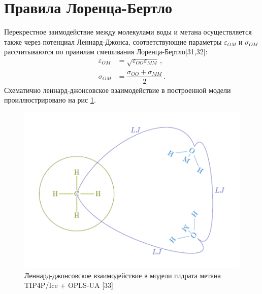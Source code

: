 \section{Правила Лоренца-Бертло}
Перекрестное заимодействие между молекулами воды и метана осуществляется также через потенциал Леннард-Джонса, соответствующие параметры $\varepsilon_{OM}$ и $\sigma_{OM}$ рассчитываются по правилам смешивания Лоренца-Бертло[31,32]:
\begin{align}
    \varepsilon_{OM} &= \sqrt{\varepsilon_{OO}\varepsilon_{MM}}\,, \label{eq2.6.2} \\
    \sigma_{OM} &= \dfrac{\sigma_{OO}+\sigma_{MM}}{2}\,.
    \label{eq2.6.3}
\end{align}
Схематично леннард-джонсовское взаимодействие в построенной модели проиллюстрировано на рис \ref{fig2.6.4}.
\begin{figure}[H]
    \centering
    \includegraphics[width=.8\linewidth]{figures/hydrmodel.png}
    \caption{Леннард-джонсовское взаимодействие в модели гидрата метана TIP4P/Ice + OPLS-UA [33]}
    \label{fig2.6.4}
\end{figure}
\pagebreak

